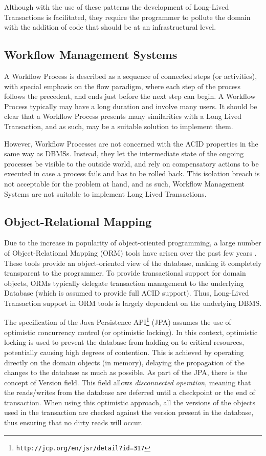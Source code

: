 \documentclass{llncs}
\begin{document}
Although with the use of these patterns the development of Long-Lived
Transactions is facilitated, they require the programmer to pollute
the domain with the addition of code that should be at an
infrastructural level.

\subsection{Workflow Management Systems}

A Workflow Process is described as a sequence of connected steps (or
activities), with special emphasis on the flow paradigm, where each
step of the process follows the precedent, and ends just before the
next step can begin. A Workflow Process typically may have a long
duration and involve many users. It should be clear that a Workflow
Process presents many similarities with a Long Lived Transaction, and
as such, may be a suitable solution to implement them.

However, Workflow Processes are not concerned with the ACID properties
in the same way as DBMSs. Instead, they let the intermediate state of
the ongoing processes be visible to the outside world, and rely on
compensatory actions to be executed in case a process fails and has to
be rolled back. This isolation breach is not acceptable for the
problem at hand, and as such, Workflow Management Systems are not
suitable to implement Long Lived Transactions.

\subsection{Object-Relational Mapping}
\label{sec:orm}

Due to the increase in popularity of object-oriented programming, a
large number of Object-Relational Mapping (ORM) tools have arisen over
the past few years \cite{orm}. These tools provide an object-oriented
view of the database, making it completely transparent to the
programmer. To provide transactional support for domain objects, ORMs
typically delegate transaction management to the underlying Database
(which is assumed to provide full ACID support). Thus, Long-Lived
Transaction support in ORM tools is largely dependent on the
underlying DBMS.

The specification of the Java Persistence
API\footnote{\texttt{http://jcp.org/en/jsr/detail?id=317}} (JPA)
assumes the use of optimistic concurrency control (or optimistic
locking). In this context, optimistic locking is used to prevent the
database from holding on to critical resources, potentially causing
high degrees of contention.  This is achieved by operating directly on
the domain objects (in memory), delaying the propagation of the
changes to the database as much as possible. As part of the JPA, there
is the concept of Version field. This field allows {\it disconnected
  operation}, meaning that the reads/writes from the database are
deferred until a checkpoint or the end of transaction. When using this
optimistic approach, all the versions of the objects used in the
transaction are checked against the version present in the database,
thus ensuring that no dirty reads will occur.
\end{document}
